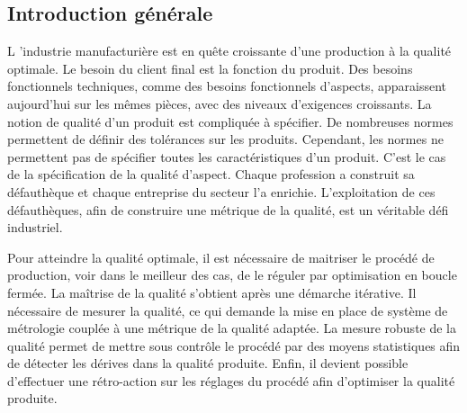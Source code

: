 {}

\vspace*{-1cm}
\begin{flushright}
\section*{\fontsize{20pt}{20pt}\selectfont\textnormal{Introduction générale}}
\end{flushright}
\vspace{2cm}

\chead[\fancyplain{}{}]
      {\fancyplain{}{}}
\lfoot[\fancyplain{}{}]%
      {\fancyplain{}{}}
\cfoot[\fancyplain{}{\thepage}]
      {\fancyplain{}{\thepage}}
\rfoot[\fancyplain{}{}]%
     {\fancyplain{}{\scriptsize}}
     

\lettrine[lines=1]{L}{ }'industrie manufacturière est en quête croissante d'une production à la qualité optimale.
Le besoin du client final est la fonction du produit.
Des besoins fonctionnels techniques, comme des besoins fonctionnels d'aspects, apparaissent aujourd'hui sur les mêmes pièces, avec des niveaux d'exigences croissants.
La notion de qualité d'un produit est compliquée à spécifier.
De nombreuses normes permettent de définir des tolérances sur les produits.
Cependant, les normes ne permettent pas de spécifier toutes les caractéristiques d'un produit.
C'est le cas de la spécification de la qualité d'aspect.
Chaque profession a construit sa défauthèque et chaque entreprise du secteur l'a enrichie.
L'exploitation de ces défauthèques, afin de construire une métrique de la qualité, est un véritable défi industriel.

Pour atteindre la qualité optimale, il est nécessaire de maitriser le procédé de production, voir dans le meilleur des cas, de le réguler par optimisation en boucle fermée.
La maîtrise de la qualité s'obtient après une démarche itérative.
Il nécessaire de mesurer la qualité, ce qui demande la mise en place de système de métrologie couplée à une métrique de la qualité adaptée.
La mesure robuste de la qualité permet de mettre sous contrôle le procédé par des moyens statistiques afin de détecter les dérives dans la qualité produite.
Enfin, il devient possible d'effectuer une rétro-action sur les réglages du procédé afin d'optimiser la qualité produite.

